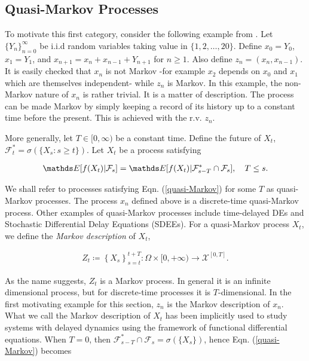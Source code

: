 \subsection{Quasi-Markov Processes}
To motivate this first category, consider the following example from \cite{XuMeiMarkov}. Let $\{Y_n\}_{n=0}^\infty$ be i.i.d random variables taking value in $\{1,2,\ldots, 20\}$. Define $x_0 = Y_0$, $x_1 = Y_1$, and $x_{n+1} = x_n + x_{n-1} + Y_{n+1}$ for $n \geq 1$. Also define $z_n = (x_n, x_{n-1})$. It is easily checked that $x_n$ is not Markov -for example $x_2$ depends on $x_0$ and $x_1$ which are themselves independent- while $z_n$ is Markov. In this example, the non-Markov nature of $x_n$ is rather trivial. It is a matter of description. The process can be made Markov by simply keeping a record of its history up to a constant time before the present. This is achieved with the r.v. $z_n$. 

More generally, let $T \in [0, \infty)$ be a constant time. Define the future of $X_t$, $\mathcal{F}_t^\ast = \sigma\left(\{X_s: s \geq t\}\right)$. Let $X_t$ be a process satisfying 

\begin{align}\label{quasi-Markov}
\bE[f(X_t) \lvert \mathcal{F}_s] = \bE[f(X_t) \lvert \mathcal{F}^\ast_{s-T}\cap\mathcal{F}_s], \quad T \leq s.
\end{align}

We shall refer to processes satisfying Eqn. (\ref{quasi-Markov}) for some $T$ as quasi-Markov processes. The process $x_n$ defined above is a discrete-time quasi-Markov process. Other examples of quasi-Markov processes include time-delayed DEs and Stochastic Differential Delay Equations (SDEEs). For a quasi-Markov process $X_t$, we define the \textit{Markov description} of $X_t$,

\begin{align}\label{Markov-description}
Z_t \coloneqq \left \{X_s\right\}_{s=t}^{t+T} : \Omega \times [0, +\infty) \rightarrow \mathcal{X}^{[0,T]}.
\end{align}

As the name suggests, $Z_t$ is a Markov process. In general it is an infinite dimensional process, but for discrete-time processes it is $T$-dimensional. In the first motivating example for this section, $z_n$ is the Markov description of $x_n$. What we call the Markov description of $X_t$ has been implicitly used to study systems with delayed dynamics using the framework of functional differential equations\cite{kolmanovskii2013introduction,richard2003time}.  When $T = 0$, then $\mathcal{F}^\ast_{s-T}\cap\mathcal{F}_s = \sigma(\{X_s\})$, hence Eqn. (\ref{quasi-Markov}) becomes 

